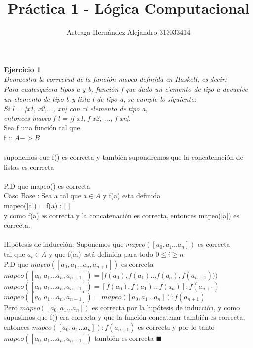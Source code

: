 \documentclass[12pt]{article}
\title{Práctica 1 - Lógica Computacional}
\author{Arteaga Hernández Alejandro 313033414}
\begin{document}
 

\maketitle
 \textbf{Ejercicio 1 \\}
\textit{Demuestra la correctud de la función mapeo definida en Haskell, es decir:\\
Para cualesquiera tipos a y b, función f que dado un elemento de tipo a devuelve un
elemento de tipo b y lista l de tipo a, se cumple lo siguiente: \\
Si l = [x1, x2,..., xn] con xi elemento de tipo a,\\ entonces
mapeo f l = [f x1, f x2, ..., f xn].}\\
Sea f una función tal que \\
f :: $A -> B$\\\\
suponemos que f() es correcta y también supondremos que la concatenación de listas es correcta\\\\
P.D que mapeo() es correcta\\
Caso Base :  Sea a tal que $a \in A $ y f(a) esta definida\\  mapeo([a]) = f(a) : [ ]\\ y como f(a) es correcta y la concatenación es correcta,
entonces mapeo([a]) es correcta.\\\\
Hipótesis de inducción: Suponemos que $mapeo([a_{0},a_{1}...a_{n}])$ es correcta\\
tal que $a_{i} \in A $ y que f($a_{i}$) está definida para todo $0\leq i \geq n$ 
\\
P.D que $mapeo([a_{0},a_{1}...a_{n},a_{n+1}])$ es correcta\\
$mapeo([a_{0},a_{1}...a_{n},a_{n+1}]) = [f(a_{0}),f(a_{1})...f(a_{n}),f(a_{n+1})))$\\
$mapeo([a_{0},a_{1}...a_{n},a_{n+1}]) = [f(a_{0}),f(a_{1})...f(a_{n})] : f(a_{n+1})$\\
$mapeo([a_{0},a_{1}...a_{n},a_{n+1}]) = mapeo([a_{0},a_{1}...a_{n}]) : f(a_{n+1})$\\
Pero $mapeo([a_{0},a_{1}...a_{n}])$ es correcta por la hipótesis de inducción, y como supusimos que f() era correcta y que la función concatenar también es correcta, entonces $mapeo([a_{0},a_{1}...a_{n}]) : f(a_{n+1})$ es correcta y por lo tanto
$mapeo([a_{0},a_{1}...a_{n},a_{n+1}])$ también es correcta $\blacksquare$
 \\\\\\\\\\\\\\\\\\\\\\\\
\end{document}
